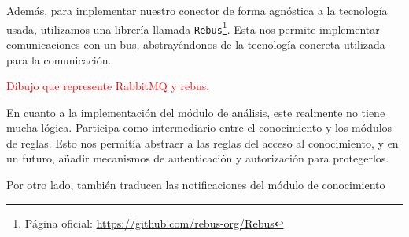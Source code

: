 Además, para implementar nuestro conector de forma agnóstica a la tecnología usada, utilizamos una librería llamada \texttt{Rebus}\footnote{Página oficial: \url{https://github.com/rebus-org/Rebus}}. Esta nos permite implementar comunicaciones con un bus, abstrayéndonos de la tecnología concreta utilizada para la comunicación.

\textcolor{red}{Dibujo que represente RabbitMQ y rebus.}

En cuanto a la implementación del módulo de análisis, este realmente no tiene mucha lógica. Participa como intermediario entre el conocimiento y los módulos de reglas. Esto nos permitía abstraer a las reglas del acceso al conocimiento, y en un futuro, añadir mecanismos de autenticación y autorización para protegerlos.

Por otro lado, también traducen las notificaciones del módulo de conocimiento
